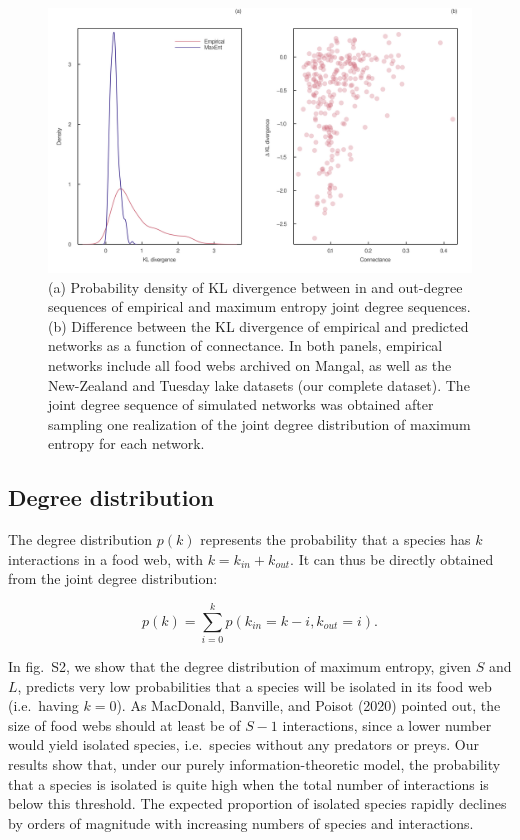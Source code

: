 \documentclass[10pt,oneside]{article}
\makeatletter
\def\maxwidth{\ifdim\Gin@nat@width>\linewidth\linewidth
\else\Gin@nat@width\fi}
\let\Oldincludegraphics\includegraphics
\renewcommand{\includegraphics}[1]{\Oldincludegraphics[width=\maxwidth]{#1}}
\makeatother
\begin{document}
\begin{figure}
\hypertarget{fig:kl_diverg}{%
\centering
\includegraphics{figures/kl_divergence.png}
\caption{(a) Probability density of KL divergence between in and
out-degree sequences of empirical and maximum entropy joint degree
sequences. (b) Difference between the KL divergence of empirical and
predicted networks as a function of connectance. In both panels,
empirical networks include all food webs archived on Mangal, as well as
the New-Zealand and Tuesday lake datasets (our complete dataset). The
joint degree sequence of simulated networks was obtained after sampling
one realization of the joint degree distribution of maximum entropy for
each network.}\label{fig:kl_diverg}
}
\end{figure}

\hypertarget{degree-distribution}{%
\subsection{Degree distribution}\label{degree-distribution}}

The degree distribution \(p(k)\) represents the probability that a
species has \(k\) interactions in a food web, with
\(k = k_{in} + k_{out}\). It can thus be directly obtained from the
joint degree distribution:

\[p(k) = \sum_{i=0}^k p(k_{in} = k - i, k_{out} = i).\]

In fig.~S2, we show that the degree distribution of maximum entropy,
given \(S\) and \(L\), predicts very low probabilities that a species
will be isolated in its food web (i.e.~having \(k = 0\)). As MacDonald,
Banville, and Poisot (2020) pointed out, the size of food webs should at
least be of \(S-1\) interactions, since a lower number would yield
isolated species, i.e.~species without any predators or preys. Our
results show that, under our purely information-theoretic model, the
probability that a species is isolated is quite high when the total
number of interactions is below this threshold. The expected proportion
of isolated species rapidly declines by orders of magnitude with
increasing numbers of species and interactions.
\end{document}
